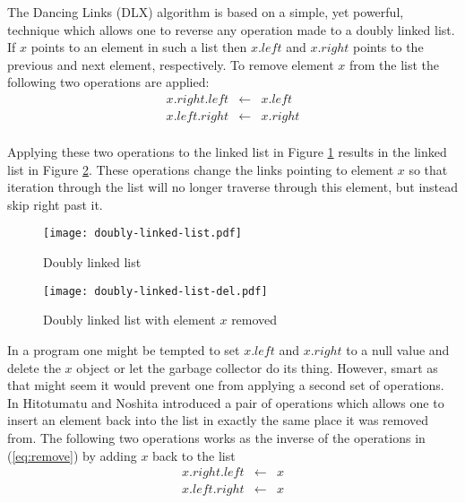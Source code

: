 The Dancing Links (DLX) algorithm is based on a simple, yet powerful, technique which allows one to reverse any operation made to a doubly linked list.
If $x$ points to an element in such a list then $x.left$ and $x.right$ points to the previous and next element, respectively.
To remove element $x$ from the list the following two operations are applied:
\begin{equation}
	\label{eq:remove}
	\begin{array}{rcl}
		x.right.left &\leftarrow& x.left \\
		x.left.right &\leftarrow& x.right \\
	\end{array}
\end{equation}

Applying these two operations to the linked list in Figure \ref{fig:linked} results in the linked list in Figure \ref{fig:linked_del}.
These operations change the links pointing to element $x$ so that iteration through the list will no longer traverse through this element, but instead skip right past it.
\begin{figure}[H]
	\centering 
	\texttt{[image: doubly-linked-list.pdf]}
	\caption{Doubly linked list}
	\label{fig:linked}
\end{figure}
\begin{figure}[H]
	\centering 
	\texttt{[image: doubly-linked-list-del.pdf]}
	\caption{Doubly linked list with element $x$ removed}
	\label{fig:linked_del}
\end{figure}

In a program one might be tempted to set $x.left$ and $x.right$ to a null value and delete the $x$ object or let the garbage collector do its thing.
However, smart as that might seem it would prevent one from applying a second set of operations.
In \cite{Hitotumatu79} Hitotumatu and Noshita introduced a pair of operations which allows one to insert an element back into the list in exactly the same place it was removed from.
The following two operations works as the inverse of the operations in (\ref{eq:remove}) by adding $x$ back to the list
\begin{equation}
	\label{eq:add}
	\begin{array}{rcl}
		x.right.left &\leftarrow& x \\
		x.left.right &\leftarrow& x \\
	\end{array}
\end{equation}

